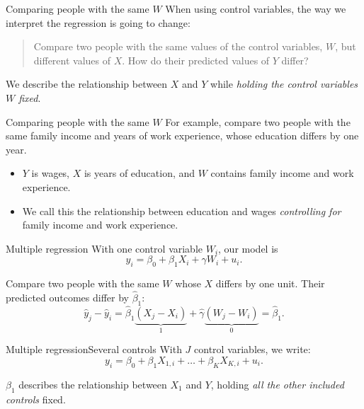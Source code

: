 \documentclass[aspectratio=169,t,11pt,table]{beamer}
\begin{document}
\begin{frame}{Comparing people with the same $W$}
  When using control variables, the way we interpret the regression is going to change:

  \begin{quote}
    Compare two people with the same values of the control variables, $W$, but different values of $X$.
    How do their predicted values of $Y$ differ?
  \end{quote}

  \pause
  \bigskip
  We describe the relationship between $X$ and $Y$ while \emph{holding the control variables $W$ fixed}.
\end{frame}

\begin{frame}{Comparing people with the same $W$}
  \bigskip
  For example, compare two people with the same family income and years of work experience, whose education differs by one year.
  \begin{itemize}
    \item $Y$ is wages, $X$ is years of education, and $W$ contains family income and work experience.
    \item We call this the relationship between education and wages \emph{controlling for} family income and work experience.
  \end{itemize}
\end{frame}

\begin{frame}{Multiple regression}
  With one control variable $W_i$, our model is
  $$
    y_i = \beta_0 + \beta_1 X_i + \gamma W_i + u_i.
  $$

  \bigskip
  Compare two people with the same $W$ whose $X$ differs by one unit.
  Their predicted outcomes differ by $\hat{\beta}_1$:
  $$
    \hat{y}_j - \hat{y}_i
    = \hat{\beta}_1 \underbrace{(X_j - X_i)}_{1}
    + \hat{\gamma} \underbrace{(W_j - W_i)}_{0}
    = \hat{\beta}_1.
  $$

\end{frame}

\begin{frame}{Multiple regression}{Several controls}
  With $J$ control variables, we write:
  $$
    y_i = \beta_0 + \beta_1 X_{1,i} + \dots + \beta_K X_{K,i} + u_i.
  $$

  \bigskip
  $\beta_1$ describes the relationship between $X_1$ and $Y$, holding \emph{all the other included controls} fixed.
\end{frame}
\end{document}
